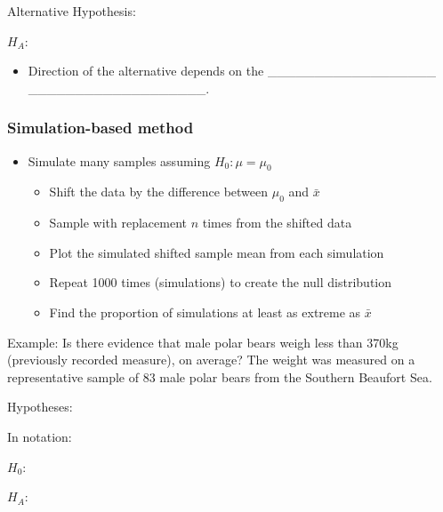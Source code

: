 \documentclass[
]{report}
\providecommand{\tightlist}{%
  \setlength{\itemsep}{0pt}\setlength{\parskip}{0pt}}
\begin{document}
Alternative Hypothesis:

\(H_A:\)

\vspace{0.2in}


\begin{itemize}
\tightlist
\item
  Direction of the alternative depends on the \_\_\_\_\_\_\_\_\_\_\_\_\_\_\_\_\_\_
  \_\_\_\_\_\_\_\_\_\_\_\_\_\_\_\_\_\_\_.
\end{itemize}


\hypertarget{simulation-based-method-3}{%
\subsubsection*{Simulation-based method}\label{simulation-based-method-3}}

\begin{itemize}
\item
  Simulate many samples assuming \(H_0: \mu = \mu_0\)

  \begin{itemize}
  \item
    Shift the data by the difference between \(\mu_0\) and \(\bar{x}\)
  \item
    Sample with replacement \(n\) times from the shifted data
  \item
    Plot the simulated shifted sample mean from each simulation
  \item
    Repeat 1000 times (simulations) to create the null distribution
  \item
    Find the proportion of simulations at least as extreme as \(\bar{x}\)
  \end{itemize}
\end{itemize}

Example: Is there evidence that male polar bears weigh less than 370kg (previously recorded measure), on average? The weight was measured on a representative sample of 83 male polar bears from the Southern Beaufort Sea.

Hypotheses:

In notation:

\(H_0:\)

\vspace{0.2in}

\(H_A:\)

\vspace{0.2in}
\end{document}
